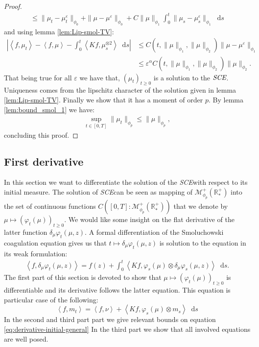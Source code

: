 \documentclass[11pt,a4paper]{article}
\newcommand{\RRP}{\mathbb{R}^+_*}
\newcommand{\MC}{\mathcal{M}}
\newcommand{\SCE}{\emph{SCE}}
\newcommand{\Proc}[1]{\left(#1\right)_{t\geq 0}}
\newcommand{\brac}[1]{\left\langle#1\right\rangle}
\newcommand{\dd}{\mathop{}\!\mathrm{d}}
\begin{document}
\begin{proof}
\begin{multline*}
        \leq \|\mu_t - \mu_t^\varepsilon\|_{\phi_0} + \|\mu - \mu^\varepsilon\|_{\phi_0} + C\|\mu\|_{\phi_1}\int_0^t \| \mu_s - \mu^\varepsilon_s \|_{\phi_1} \dd s
    \end{multline*}
    and using lemma \ref{lem:Lip-smol-TV}:
    \begin{align*}
        \left|\brac{f,\mu_t} - \brac{f,\mu} - \int_0^t\brac{Kf,\mu_s^{\otimes 2}}\dd s\right| &\leq C(t,\|\mu\|_{\phi_1},\|\mu\|_{\phi_2})\|\mu - \mu^\varepsilon\|_{\phi_1} \\
        &\leq \varepsilon^{\alpha} C(t,\|\mu\|_{\phi_1},\|\mu\|_{\phi_2})\|\mu\|_{\phi_2}.
    \end{align*}
    That being true for all $\varepsilon$ we have that, $\Proc{\mu_t}$ is a solution to the $\SCE$. Uniqueness comes from the lipschitz character of the solution given in lemma \ref{lem:Lip-smol-TV}. Finally we show that it has a moment of order $p$. By lemma \ref{lem:bound_smol_1} we have:
    \begin{align*}
        \sup\limits_{t \in [0,T]} \| \mu_t\|_{\phi_{p}} \leq  \| \mu\|_{\phi_{p}},
    \end{align*}
    concluding this proof.
\end{proof}

\subsection{First derivative}
In this section we want to differentiate the solution of the \SCE with respect to its initial measure. The solution of \SCE can be seen as mapping of $\MC^+_{\phi_p}\left(\RRP \right)$ into the set of continuous functions $C\left([0,T]:\MC^+_{\phi_p}\left(\RRP \right)\right)$ that we denote by $\mu \mapsto \Proc{\varphi_t(\mu)}$. We would like some insight on the flat derivative of the latter function $\delta_\mu \varphi_t(\mu,z)$. A formal differentiation of the Smoluchowski coagulation equation gives us that $t \mapsto \delta_\mu \varphi_t(\mu,z)$ is solution to the equation in its weak formulation:
\begin{align*}
    \brac{f,\delta_\mu \varphi_t(\mu,z)} = f(z) + \int_0^t \brac{Kf,\varphi_s(\mu)\otimes \delta_\mu \varphi_s(\mu,z)}\dd s.
\end{align*}
The first part of this section is devoted to show that $\mu \mapsto \Proc{\varphi_t(\mu)}$ is differentiable and its derivative follows the latter equation. This equation is particular case of the following: 
\begin{equation}\label{eq:derivative-initial-general}
    \brac{f,m_t} = \brac{f,\nu} + \brac{Kf,\varphi_s(\mu)\otimes m_s}\dd s
\end{equation}
In the second and third part part we give relevant bounds on equation \ref{eq:derivative-initial-general} In the third part we show that all involved equations are well posed.
\end{document}
